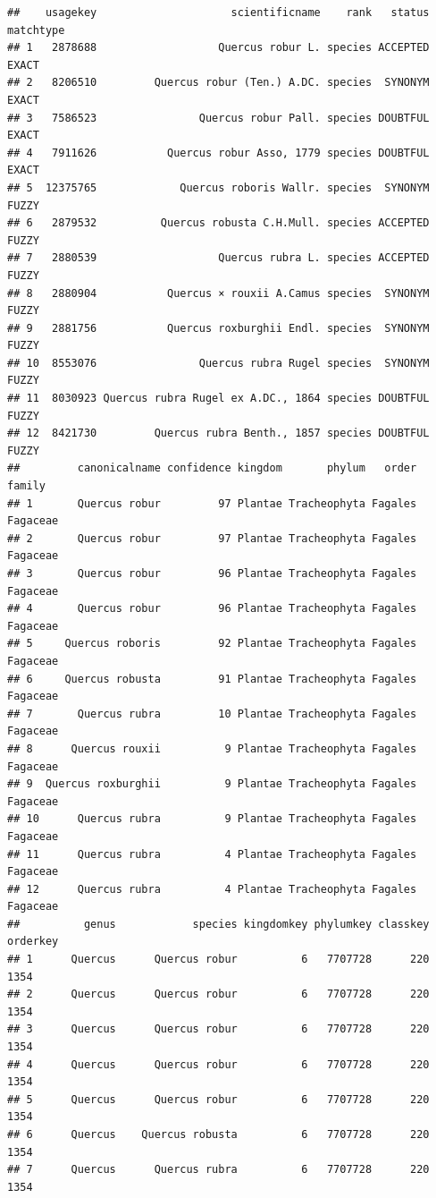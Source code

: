 \documentclass[
]{book}
\begin{document}
\begin{verbatim}
##    usagekey                     scientificname    rank   status matchtype
## 1   2878688                   Quercus robur L. species ACCEPTED     EXACT
## 2   8206510         Quercus robur (Ten.) A.DC. species  SYNONYM     EXACT
## 3   7586523                Quercus robur Pall. species DOUBTFUL     EXACT
## 4   7911626           Quercus robur Asso, 1779 species DOUBTFUL     EXACT
## 5  12375765             Quercus roboris Wallr. species  SYNONYM     FUZZY
## 6   2879532          Quercus robusta C.H.Mull. species ACCEPTED     FUZZY
## 7   2880539                   Quercus rubra L. species ACCEPTED     FUZZY
## 8   2880904           Quercus × rouxii A.Camus species  SYNONYM     FUZZY
## 9   2881756           Quercus roxburghii Endl. species  SYNONYM     FUZZY
## 10  8553076                Quercus rubra Rugel species  SYNONYM     FUZZY
## 11  8030923 Quercus rubra Rugel ex A.DC., 1864 species DOUBTFUL     FUZZY
## 12  8421730         Quercus rubra Benth., 1857 species DOUBTFUL     FUZZY
##         canonicalname confidence kingdom       phylum   order   family
## 1       Quercus robur         97 Plantae Tracheophyta Fagales Fagaceae
## 2       Quercus robur         97 Plantae Tracheophyta Fagales Fagaceae
## 3       Quercus robur         96 Plantae Tracheophyta Fagales Fagaceae
## 4       Quercus robur         96 Plantae Tracheophyta Fagales Fagaceae
## 5     Quercus roboris         92 Plantae Tracheophyta Fagales Fagaceae
## 6     Quercus robusta         91 Plantae Tracheophyta Fagales Fagaceae
## 7       Quercus rubra         10 Plantae Tracheophyta Fagales Fagaceae
## 8      Quercus rouxii          9 Plantae Tracheophyta Fagales Fagaceae
## 9  Quercus roxburghii          9 Plantae Tracheophyta Fagales Fagaceae
## 10      Quercus rubra          9 Plantae Tracheophyta Fagales Fagaceae
## 11      Quercus rubra          4 Plantae Tracheophyta Fagales Fagaceae
## 12      Quercus rubra          4 Plantae Tracheophyta Fagales Fagaceae
##          genus            species kingdomkey phylumkey classkey orderkey
## 1      Quercus      Quercus robur          6   7707728      220     1354
## 2      Quercus      Quercus robur          6   7707728      220     1354
## 3      Quercus      Quercus robur          6   7707728      220     1354
## 4      Quercus      Quercus robur          6   7707728      220     1354
## 5      Quercus      Quercus robur          6   7707728      220     1354
## 6      Quercus    Quercus robusta          6   7707728      220     1354
## 7      Quercus      Quercus rubra          6   7707728      220     1354

\end{verbatim}
\end{document}
